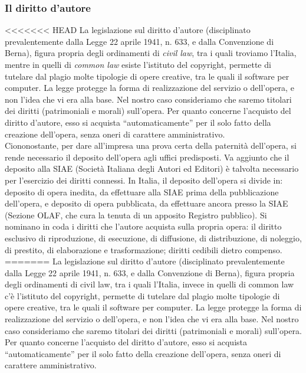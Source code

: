 \subsubsection{Il diritto d'autore}
<<<<<<< HEAD
La legislazione sul diritto d'autore (disciplinato prevalentemente dalla Legge 22 aprile 1941, n. 633, e dalla Convenzione di Berna), figura propria degli ordinamenti di \textit{civil law}, tra i quali troviamo l'Italia, mentre in quelli di \textit{common law} esiste l'istituto del copyright, permette di tutelare dal plagio molte tipologie di opere creative, tra le quali il software per computer. La legge protegge la forma di realizzazione del servizio o dell'opera, e non l'idea che vi era alla base. Nel nostro caso consideriamo che saremo titolari dei diritti (patrimoniali e morali) sull'opera. Per quanto concerne l'acquisto del diritto d'autore, esso si acquista ``automaticamente'' per il solo fatto della creazione dell'opera, senza oneri di carattere amministrativo.\\
Ciononostante, per dare all'impresa una prova certa della paternità dell'opera, si rende necessario il deposito dell'opera agli uffici predisposti. Va aggiunto che il deposito alla SIAE (Società Italiana degli Autori ed Editori) è talvolta necessario per l'esercizio dei diritti connessi. In Italia, il deposito dell'opera si divide in: deposito di opera inedita, da effettuare alla SIAE prima della pubblicazione dell'opera, e deposito di opera pubblicata, da effettuare ancora presso la SIAE (Sezione OLAF, che cura la tenuta di un apposito Registro pubblico). Si nominano in coda i diritti che l'autore acquista sulla propria opera: il diritto esclusivo di riproduzione, di esecuzione, di diffusione, di distribuzione, di noleggio, di prestito, di elaborazione e trasformazione; diritti cedibili dietro compenso.
=======
La legislazione sul diritto d'autore (disciplinato prevalentemente dalla Legge 22 aprile 1941, n. 633, e dalla Convenzione di Berna), figura propria degli ordinamenti di civil law, tra i quali l'Italia, invece in quelli di common law c'è l'istituto del copyright, permette di tutelare dal plagio molte tipologie di opere creative, tra le quali il software per computer. La legge protegge la forma di realizzazione del servizio o dell'opera, e non l'idea che vi era alla base. Nel nostro caso consideriamo che saremo titolari dei diritti (patrimoniali e morali) sull'opera. Per quanto concerne l'acquisto del diritto d'autore, esso si acquista ``automaticamente'' per il solo fatto della creazione dell'opera, senza oneri di carattere amministrativo.\\
